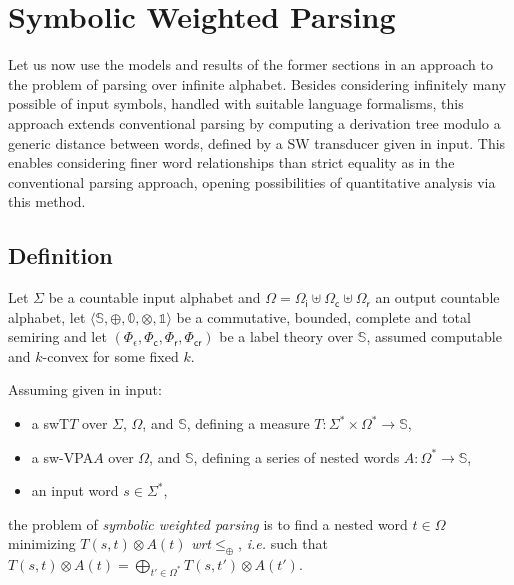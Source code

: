 \documentclass[runningheads]{llncs}
\def\ie{\textit{i.e.}\xspace}
\def\wrt{\textit{wrt}\xspace}
\def\<#1>{\langle #1 \rangle}
\newcommand{\Semiring}{\mathbb{S}}
\newcommand{\zero}{\mathbb{0}}
\newcommand{\one}{\mathbb{1}}
\def\SWT{\textsf{swT}\xspace}
\def\SWVPA{\textsf{sw-VPA}\xspace}
\def\Omegai{{\Omega_\mathsf{i}}}
\def\Omegac{{\Omega_\mathsf{c}}}
\def\Omegar{{\Omega_\mathsf{r}}}
\def\Phic{{\Phi_\mathsf{c}}}
\def\Phir{{\Phi_\mathsf{r}}}
\def\Phicr{{\Phi_\mathsf{cr}}}
\begin{document}
\section{Symbolic Weighted Parsing}
\label{sec:parsing}
Let us now use the models and results of the former sections in %
an approach to the problem of parsing over infinite alphabet. %
%
Besides considering infinitely many possible of input symbols, 
handled with suitable language formalisms, 
this approach extends conventional parsing 
by computing a derivation tree modulo 
a generic distance between words,  
defined by a SW transducer given in input.
This enables considering finer word relationships than strict equality 
as in the conventional parsing approach, 
opening possibilities of quantitative analysis via this method.

\subsection{Definition}

Let $\Sigma$ be a countable input alphabet 
and $\Omega = \Omegai \uplus \Omegac \uplus \Omegar$ an output countable alphabet,
let $\< \Semiring, \oplus, \zero, \otimes, \one>$ be a commutative, bounded, complete 
and total semiring 
and let  $(\Phi_\epsilon, \Phic, \Phir, \Phicr)$ be a label theory over $\Semiring$, 
assumed computable and $k$-convex for some fixed $k$.

\noindent
Assuming given in input:
\begin{itemize}
\item a \SWT $T$ over $\Sigma$,  $\Omega$, and $\Semiring$,
defining a measure %
$T: \Sigma^* \times \Omega^* \to \Semiring$,
\item a \SWVPA $A$ over $\Omega$, and $\Semiring$, defining a series of nested words
      $A : \Omega^* \to \Semiring$,
\item an input word $s \in \Sigma^*$,
\end{itemize}
the problem of \emph{symbolic weighted parsing} is to find 
a nested word $t \in \Omega$ minimizing
\( T(s, t) \otimes A(t)\)
\wrt $\leq_\oplus$, 
\ie such that %
\( T(s, t) \otimes A(t) = 
  \displaystyle\bigoplus_{t' \in \Omega^*} T(s, t') \otimes A(t') \).
\end{document}
